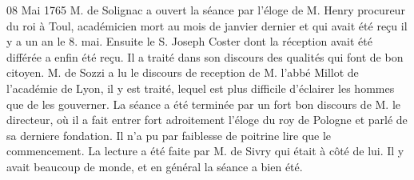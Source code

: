 \begin{diary}{08 Mai 1765}{}
                           M. de Solignac a ouvert la séance
                           par
                           l'éloge de M. Henry
                           procureur du roi à Toul,
                           académicien mort au mois de janvier dernier
                           et qui avait été reçu il y a un an le 8.
                              mai.
                           Ensuite le S. Joseph Coster dont
                           la réception
                           avait été différée a enfin été reçu. Il a
                           traité dans son discours des
                           qualités qui font
                           de bon citoyen. M. de Sozzi a
                           lu le discours
                              de reception de M. l'abbé
                                 Millot de l'académie
                              de Lyon, il y est traité, lequel est plus difficile
                           d'éclairer les hommes que de les gouverner.
                           La séance a été terminée par un fort
                           bon discours de M. le
                              directeur, où il a fait entrer fort
                           adroitement l'éloge du roy de Pologne
                           et parlé de sa derniere fondation. Il n'a
                           pu par faiblesse de poitrine lire que le commencement.
                           La lecture a été faite par M. de
                              Sivry qui
                           était à côté de lui. Il y avait beaucoup de
                           monde, et en général la séance a bien été. \bigskip



\end{diary}
